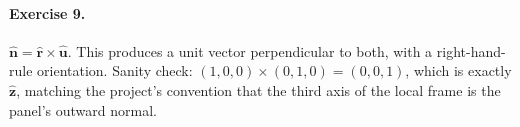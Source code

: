 \documentclass{article}
\begin{document}
\paragraph{Exercise 9.}
$\hat{\mathbf{n}} = \hat{\mathbf{r}} \times \hat{\mathbf{u}}$. This produces
a unit vector perpendicular to both, with a right-hand-rule orientation.
Sanity check: $(1,0,0) \times (0,1,0) = (0,0,1)$, which is exactly
$\hat{\mathbf{z}}$, matching the project's convention that the third axis
of the local frame is the panel's outward normal.
\end{document}
